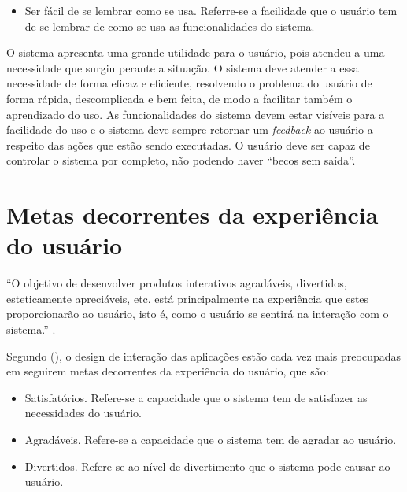     \begin{itemize}
       \item Ser fácil de se lembrar como se usa.
       \subitem Referre-se a facilidade que o usuário tem de se lembrar de como se usa as funcionalidades do sistema.
    \end{itemize}
  
    O sistema apresenta uma grande utilidade para o usuário, pois atendeu a uma necessidade que surgiu perante a situação. 
    O sistema deve atender a essa necessidade de forma eficaz e eficiente, resolvendo o problema do usuário de forma rápida,
    descomplicada e bem feita, de modo a facilitar também o aprendizado do uso. As funcionalidades do sistema devem estar visíveis 
    para a facilidade do uso e o sistema deve sempre retornar um \textit{feedback} ao usuário a respeito das ações que estão sendo executadas.
    O usuário deve ser capaz de controlar o sistema por completo, não podendo haver “becos sem saída”.

  \section{Metas decorrentes da experiência do usuário}
    
    “O objetivo de desenvolver produtos interativos agradáveis, divertidos, esteticamente apreciáveis, etc. 
    está principalmente na experiência que estes proporcionarão ao usuário, isto é, como o usuário se 
    sentirá na interação com o sistema.” \cite{preece}.
    
    Segundo \citeauthor{preece} (\citeyear{preece}), o design de interação das aplicações estão cada vez mais preocupadas em seguirem 
    metas decorrentes da experiência do usuário, que são:
    
    \begin{itemize}
       \item Satisfatórios.
       \subitem Refere-se a capacidade que o sistema tem de satisfazer as necessidades do usuário.
    \end{itemize}
    
    \begin{itemize}
       \item Agradáveis.
       \subitem Refere-se a capacidade que o sistema tem de agradar ao usuário.
    \end{itemize}
    
    \begin{itemize}
       \item Divertidos.
       \subitem Refere-se ao nível de divertimento que o sistema pode causar ao usuário.
    \end{itemize}
    
